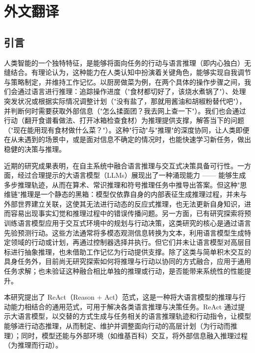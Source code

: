 \cleardoublepage

\newrefsection

\chapter{外文翻译}


\section{引言}

人类智能的一个独特特征，是能够将面向任务的行动与语言推理（即内心独白）无缝结合。有理论认为，这种能力在人类认知中扮演着关键角色，能够实现自我调节与策略制定，并维持工作记忆。以厨房做菜为例，在两个具体的操作步骤之间，我们会通过语言进行推理：追踪操作进度（"食材都切好了，该烧水煮锅了"）、处理突发状况或根据实际情况调整计划（"没有盐了，那就用酱油和胡椒粉替代吧"），并判断何时需要获取外部信息（"怎么揉面团？我去网上查一下"）。我们也会通过行动（翻开食谱看做法、打开冰箱检查食材）为推理提供支撑，解答当下的问题（"现在能用现有食材做什么菜？"）。这种"行动"与"推理"的深度协同，让人类即便在从未遇到的场景中，或是面对信息不确定的情况时，也能快速学习新任务，做出稳健的决策与推理。

近期的研究成果表明，在自主系统中融合语言推理与交互式决策具备可行性。一方面，经过合理提示的大语言模型（LLMs）展现出了一种涌现能力 —— 能够生成多步推理轨迹，从而在算术、常识推理和符号推理任务中推导出答案。但这种"思维链"推理是一个静态的黑箱：模型仅依靠自身的内部表征生成推理过程，并未与外部世界建立关联，这使其无法进行动态的反应式推理，也无法更新自身知识，进而容易出现事实幻觉和推理过程中的错误传播问题。另一方面，已有研究探索将预训练语言模型应用于交互式环境中的规划与行动决策，这类研究的核心是通过语言先验预测行动。这些方法通常将多模态观测信息转换为文本，利用语言模型生成特定领域的行动或计划，再通过控制器选择并执行。但它们并未让语言模型对高层目标进行抽象推理，也未借助工作记忆为行动提供支撑。除了这类与简单积木交互的具身任务外，目前尚无研究探索如何将推理与行动以协同的方式融合，应用于通用任务求解；也未验证这种融合相比单独的推理或行动，是否能带来系统性的性能提升。

本研究提出了 ReAct（Reason + Act）范式，这是一种将大语言模型的推理与行动能力相结合的通用范式，可用于解决各类语言推理与决策任务。ReAct 通过提示大语言模型，以交替的方式生成与任务相关的语言推理轨迹和行动指令，让模型能够进行动态推理，从而制定、维护并调整面向行动的高层计划（为行动而推理）；同时，模型还能与外部环境（如维基百科）交互，将外部信息融入推理过程（为推理而行动）。

